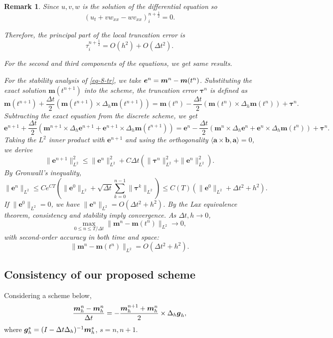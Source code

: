 \documentclass[preprint,times,3p]{elsarticle}
\newtheorem{remark}{Remark}
\def\e{\mbox{\boldmath $e$}}
\def\g{\mbox{\boldmath $g$}}
\def\m{\mbox{\boldmath $m$}}
\begin{document}
\begin{remark}
Since \(u, v, w\) is the solution of the differential equation so
\[
\left( u_t + v w_{xx} - w v_{xx} \right)_i^{n+\frac{1}{2}} = 0.
\]

Therefore, the principal part of the local truncation error is
\[
\tau_i^{n+\frac{1}{2}} = O(h^2) + O(\Delta t^2).
\]

For the second and third components of the equations, we get same results.

For the stability analysis of \cref{eq-8-tr}, we take $\e^n=\m^n-\m(t^n)$. Substituting the exact solution \(\boldsymbol{m}(t^{n+1})\) into the scheme, the truncation error \(\boldsymbol{\tau}^n\) is defined as
\[
\boldsymbol{m}(t^{n+1}) + \frac{\Delta t}{2}\left(\boldsymbol{m}(t^{n+1}) \times \Delta_h \boldsymbol{m}(t^{n+1})\right)
= \boldsymbol{m}(t^n) - \frac{\Delta t}{2}\left(\boldsymbol{m}(t^n) \times \Delta_h \boldsymbol{m}(t^n)\right) + \boldsymbol{\tau}^n.
\]
Subtracting the exact equation from the discrete scheme, we get
\[
\boldsymbol{e}^{n+1} + \frac{\Delta t}{2}\left(\boldsymbol{m}^{n+1} \times \Delta_h \boldsymbol{e}^{n+1} + \boldsymbol{e}^{n+1} \times \Delta_h \boldsymbol{m}(t^{n+1})\right)
= \boldsymbol{e}^n - \frac{\Delta t}{2}\left(\boldsymbol{m}^n \times \Delta_h \boldsymbol{e}^n + \boldsymbol{e}^n \times \Delta_h \boldsymbol{m}(t^n)\right) + \boldsymbol{\tau}^n.
\]
Taking the \(L^2\) inner product with \(\boldsymbol{e}^{n+1}\) and using the orthogonality \(\langle \boldsymbol{a} \times \boldsymbol{b}, \boldsymbol{a} \rangle = 0\), we derive
\[
\|\boldsymbol{e}^{n+1}\|_{L^2}^2 \leq \|\boldsymbol{e}^n\|_{L^2}^2 + C\Delta t\left(\|\boldsymbol{\tau}^n\|_{L^2}^2 + \|\boldsymbol{e}^n\|_{L^2}^2\right).
\]
By Gronwall's inequality,
\[
\|\boldsymbol{e}^n\|_{L^2} \leq C e^{CT}\left(\|\boldsymbol{e}^0\|_{L^2} + \sqrt{\Delta t}\sum_{k=0}^{n-1}\|\boldsymbol{\tau}^k\|_{L^2}\right)
\leq C(T)\left(\|\boldsymbol{e}^0\|_{L^2} + \Delta t^2 + h^2\right).
\]
If $\|\boldsymbol{e}^0\|_{L^2} =0$, we have $\|\boldsymbol{e}^n\|_{L^2} = O(\Delta t^2 + h^2)$. By the Lax equivalence theorem, consistency and stability imply convergence. As \(\Delta t, h \to 0\),
\[
\max_{0 \leq n \leq T/\Delta t}\|\boldsymbol{m}^n - \boldsymbol{m}(t^n)\|_{L^2} \to 0,
\]
with second-order accuracy in both time and space:
\[
\|\boldsymbol{m}^n - \boldsymbol{m}(t^n)\|_{L^2} = O(\Delta t^2 + h^2).
\]
\end{remark}


\subsection{Consistency of our proposed scheme}
Considering a scheme below,
\begin{align*}
    \frac{\m_h^n-\m_h^n}{\Delta t}=-\frac{\m_h^{n+1}+\m_h^n}{2}\times \Delta_h \g_h,
\end{align*}
where $\g_h^s=(I-\Delta t \Delta_h)^{-1}\m_h^s$, $s=n,n+1$.
\end{document}

